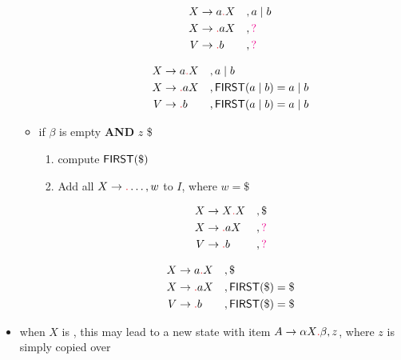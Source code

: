 \documentclass[10pt,a4paper,landscape]{article}
\begin{document}
\begin{multicols*}{3}
\begin{itemize}
\begin{itemize}[leftmargin=3em]
\begin{enumerate}
      \begin{minipage}{.3\linewidth}
        \begin{align*}
          X&\to a\lrd X & &, a\gor b \\
          X&\to \lrd aX & &,\mr{?}  \\
          V&\to \lrd b  & &,\mr{?}
        \end{align*}
      \end{minipage}
      \begin{minipage}{.7\linewidth}
        \begin{align*}
          X&\to a\lrd X & &, a\gor b \\
          X&\to \lrd aX & &,\mfn{first}(a\gor b) = a\gor b \\
          V&\to \lrd b  & &,\mfn{first}(a\gor b) = a\gor b
        \end{align*}
      \end{minipage}
    \end{enumerate}
  \item if $\beta$ is empty \textbf{AND} $z$  \$
    \begin{enumerate}
    \item compute $\mfn{first}(\$)$
    \item Add all $X\to\lrd \ldots, w$ to $I$, where $w =\$$

      \begin{minipage}{.3\linewidth}
        \begin{align*}
          X&\to X\lrd X & &, \$ \\
          X&\to \lrd aX & &,\mr{?}  \\
          V&\to \lrd b  & &,\mr{?}
        \end{align*}
      \end{minipage}
      \begin{minipage}{.7\linewidth}
        \begin{align*}
          X&\to a\lrd X & &, \$ \\
          X&\to \lrd aX & &,\mfn{first}(\$) = \$ \\
          V&\to \lrd b  & &,\mfn{first}(\$) = \$
        \end{align*}
      \end{minipage}
    \end{enumerate}
  \end{itemize}
\item when $X$ is , this may lead to a new state with item $A\to \alpha X\lrd \beta, z$, where $z$ is simply copied over
\end{itemize}
\end{multicols*}
\end{document}
